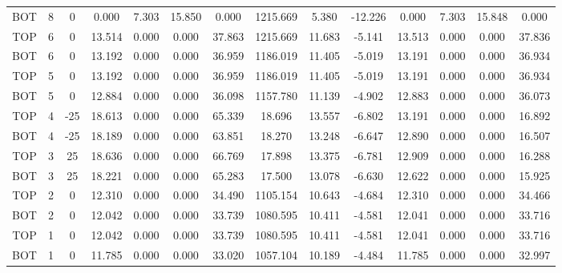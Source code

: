 {\begin{tabular}{cccccccccccccc}
BOT      &  8 &        0 &  0.000 &  7.303 & 15.850 &  0.000 & 1215.669 &  5.380 & -12.226 &  0.000 &  7.303 & 15.848 &  0.000 \\
TOP      &  6 &        0 & 13.514 &  0.000 &  0.000 & 37.863 & 1215.669 & 11.683 &  -5.141 & 13.513 &  0.000 &  0.000 & 37.836 \\
BOT      &  6 &        0 & 13.192 &  0.000 &  0.000 & 36.959 & 1186.019 & 11.405 &  -5.019 & 13.191 &  0.000 &  0.000 & 36.934 \\
TOP      &  5 &        0 & 13.192 &  0.000 &  0.000 & 36.959 & 1186.019 & 11.405 &  -5.019 & 13.191 &  0.000 &  0.000 & 36.934 \\
BOT      &  5 &        0 & 12.884 &  0.000 &  0.000 & 36.098 & 1157.780 & 11.139 &  -4.902 & 12.883 &  0.000 &  0.000 & 36.073 \\
TOP      &  4 &      -25 & 18.613 &  0.000 &  0.000 & 65.339 &   18.696 & 13.557 &  -6.802 & 13.191 &  0.000 &  0.000 & 16.892 \\
BOT      &  4 &      -25 & 18.189 &  0.000 &  0.000 & 63.851 &   18.270 & 13.248 &  -6.647 & 12.890 &  0.000 &  0.000 & 16.507 \\
TOP      &  3 &       25 & 18.636 &  0.000 &  0.000 & 66.769 &   17.898 & 13.375 &  -6.781 & 12.909 &  0.000 &  0.000 & 16.288 \\
BOT      &  3 &       25 & 18.221 &  0.000 &  0.000 & 65.283 &   17.500 & 13.078 &  -6.630 & 12.622 &  0.000 &  0.000 & 15.925 \\
TOP      &  2 &        0 & 12.310 &  0.000 &  0.000 & 34.490 & 1105.154 & 10.643 &  -4.684 & 12.310 &  0.000 &  0.000 & 34.466 \\
BOT      &  2 &        0 & 12.042 &  0.000 &  0.000 & 33.739 & 1080.595 & 10.411 &  -4.581 & 12.041 &  0.000 &  0.000 & 33.716 \\
TOP      &  1 &        0 & 12.042 &  0.000 &  0.000 & 33.739 & 1080.595 & 10.411 &  -4.581 & 12.041 &  0.000 &  0.000 & 33.716 \\
BOT      &  1 &        0 & 11.785 &  0.000 &  0.000 & 33.020 & 1057.104 & 10.189 &  -4.484 & 11.785 &  0.000 &  0.000 & 32.997 \\
\bottomrule
\end{tabular}
}%